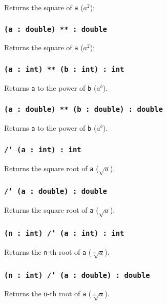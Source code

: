 Returns the square of \texttt{a} ($a^2$);

\subsubsection{\texttt{(a : double) ** : double}}

Returns the square of \texttt{a} ($a^2$);

\subsubsection{\texttt{(a : int) ** (b : int) : int}}

Returns \texttt{a} to the power of \texttt{b} ($a^b$).

\subsubsection{\texttt{(a : double) ** (b : double) : double}}

Returns \texttt{a} to the power of \texttt{b} ($a^b$).

\subsubsection{\texttt{/' (a : int) : int}}

Returns the square root of \texttt{a} ($\sqrt{a}$).

\subsubsection{\texttt{/' (a : double) : double}}

Returns the square root of \texttt{a} ($\sqrt{a}$).

\subsubsection{\texttt{(n : int) /' (a : int) : int}}

Returns the \texttt{n}-th root of \texttt{a} ($\sqrt[n]{a}$).

\subsubsection{\texttt{(n : int) /' (a : double) : double}}

Returns the \texttt{n}-th root of \texttt{a} ($\sqrt[n]{a}$).

